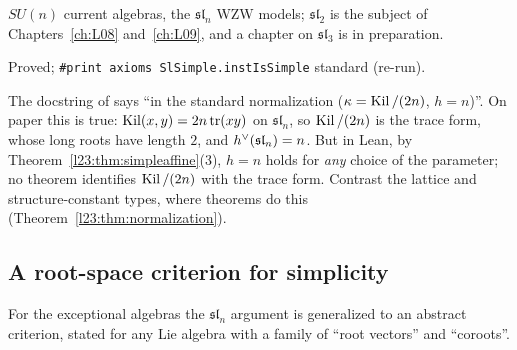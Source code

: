 \begin{physics}
$SU(n)$ current algebras, the $\mathfrak{sl}_n$ WZW models; $\mathfrak{sl}_2$ is the subject of
Chapters~\ref{ch:L08} and~\ref{ch:L09}, and a chapter on $\mathfrak{sl}_3$ is in preparation.
\end{physics}

\begin{status}
Proved; \texttt{\#print axioms SlSimple.instIsSimple} standard (re-run).
\end{status}

\begin{warning}[title={Trap: The normalization of \texttt{slAffineVOA} is not proved standard}]\label{l23:warn:slnnorm}
The docstring of  says ``in the standard normalization ($\kappa=\operatorname{Kil}/(2n)$, $h=n$)''. On paper this is true:
$\operatorname{Kil}(x,y)=2n\operatorname{tr}(xy)$ on $\mathfrak{sl}_n$, so $\operatorname{Kil}/(2n)$ is the trace form, whose long roots have length $2$, and
$h^\vee(\mathfrak{sl}_n)=n$. But in Lean, by Theorem~\ref{l23:thm:simpleaffine}(3), $h=n$ holds for \emph{any} choice of the
parameter; no theorem identifies $\operatorname{Kil}/(2n)$ with the trace form. Contrast the lattice and structure-constant types, where
 theorems do this (Theorem~\ref{l23:thm:normalization}).
\end{warning}

\subsection{A root-space criterion for simplicity}

For the exceptional algebras the $\mathfrak{sl}_n$ argument is generalized to an abstract criterion, stated for any Lie algebra with
a family of ``root vectors'' and ``coroots''.

